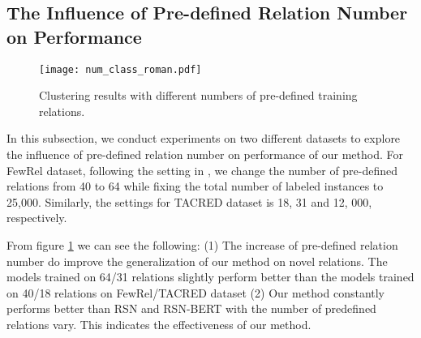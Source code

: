 \documentclass[11pt]{article}
\begin{document}
    \subsection{The Influence of Pre-defined Relation Number on Performance}
        \begin{figure}[t]
            \texttt{[image: num\_class\_roman.pdf]}
            \caption{Clustering results with different numbers of pre-defined training relations.}
            \label{fig:num_class}
        \end{figure}
        In this subsection, we conduct experiments on two different datasets to explore the influence of pre-defined relation number on performance of our method. For FewRel dataset, following the setting in \citep{wu-etal-2019-open}, we change the number of pre-defined relations from 40 to 64 while fixing the total number of labeled instances to 25,000. Similarly, the settings for TACRED dataset is 18, 31 and 12, 000, respectively.


From figure \ref{fig:num_class} we can see the following: (1) The increase of pre-defined relation number do improve the generalization of our method on novel relations. The models trained on 64/31 relations slightly perform better than the models trained on 40/18 relations on FewRel/TACRED dataset (2) Our method constantly performs better than RSN and RSN-BERT with the number of predefined relations vary. This indicates the effectiveness of our method.
        
\end{document}
